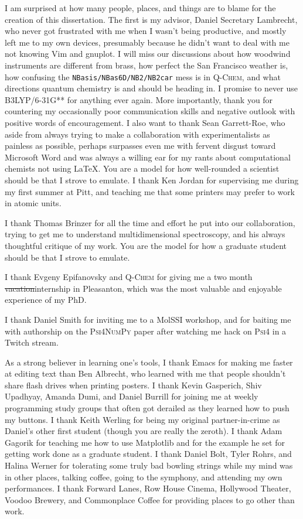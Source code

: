 \documentclass[%
  class = article,%
  crop = false,%
  float = true,%
  multi = true,%
  preview = false,%
]{standalone}
\begin{document}
I am surprised at how many people, places, and things are to blame for the creation of this dissertation. The first is my advisor, Daniel Secretary Lambrecht, who never got frustrated with me when I wasn't being productive, and mostly left me to my own devices, presumably because he didn't want to deal with me not knowing Vim and gnuplot. I will miss our discussions about how woodwind instruments are different from brass, how perfect the San Francisco weather is, how confusing the \texttt{NBasis/NBas6D/NB2/NB2car} mess is in \textsc{Q-Chem}, and what directions quantum chemistry is and should be heading in. I promise to never use B3LYP/6-31G** for anything ever again. More importantly, thank you for countering my occasionally poor communication skills and negative outlook with positive words of encouragement. I also want to thank Sean Garrett-Roe, who aside from always trying to make a collaboration with experimentalists as painless as possible, perhaps surpasses even me with fervent disgust toward Microsoft Word and was always a willing ear for my rants about computational chemists not using \LaTeX{}. You are a model for how well-rounded a scientist should be that I strove to emulate. I thank Ken Jordan for supervising me during my first summer at Pitt, and teaching me that some printers may prefer to work in atomic units.

I thank Thomas Brinzer for all the time and effort he put into our collaboration, trying to get me to understand multidimensional spectroscopy, and his always thoughtful critique of my work. You are the model for how a graduate student should be that I strove to emulate.

I thank Evgeny Epifanovsky and \textsc{Q-Chem} for giving me a two month \st{vacation}internship in Pleasanton, which was the most valuable and enjoyable experience of my PhD.

I thank Daniel Smith for inviting me to a MolSSI workshop, and for baiting me with authorship on the \textsc{Psi4NumPy} paper after watching me hack on \textsc{Psi4} in a Twitch stream.

As a strong believer in learning one's tools, I thank Emacs for making me faster at editing text than Ben Albrecht, who learned with me that people shouldn't share flash drives when printing posters. I thank Kevin Gasperich, Shiv Upadhyay, Amanda Dumi, and Daniel Burrill for joining me at weekly programming study groups that often got derailed as they learned how to push my buttons. I thank Keith Werling for being my original partner-in-crime as Daniel's other first student (though you are really the zeroth). I thank Adam Gagorik for teaching me how to use Matplotlib and for the example he set for getting work done as a graduate student. I thank Daniel Bolt, Tyler Rohrs, and Halina Werner for tolerating some truly bad bowling strings while my mind was in other places, talking coffee, going to the symphony, and attending my own performances. I thank Forward Lanes, Row House Cinema, Hollywood Theater, Voodoo Brewery, and Commonplace Coffee for providing places to go other than work.
\end{document}
